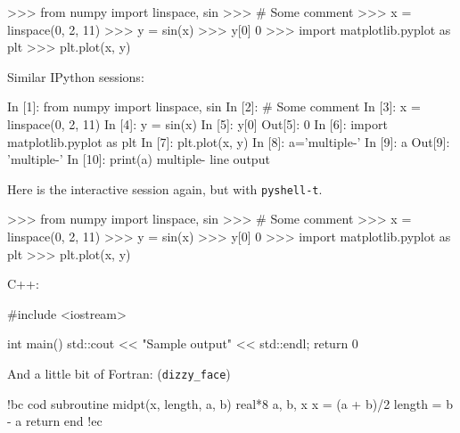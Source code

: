\documentclass[%
oneside,                 %
final,                   %
10pt]{article}
\theoremstyle{definition}
\begin{document}
\bpyshell
>>> from numpy import linspace, sin
>>> # Some comment
>>> x = linspace(0, 2, 11)
>>> y = sin(x)
>>> y[0]
0
>>> import matplotlib.pyplot as plt
>>> plt.plot(x, y)

\epyshell


Similar IPython sessions:

















\bipy
In [1]: from numpy import linspace, sin
In [2]: # Some comment
In [3]: x = linspace(0, 2, 11)
In [4]: y = sin(x)
In [5]: y[0]
Out[5]: 0
In [6]: import matplotlib.pyplot as plt
In [7]: plt.plot(x, y)
In [8]: a='multiple-\nline\noutput'
In [9]: a
Out[9]: 'multiple-\nline\noutput'
In [10]: print(a)
multiple-
line
output

\eipy


Here is the interactive session again, but with \texttt{pyshell-t}.










\bpyshell
>>> from numpy import linspace, sin
>>> # Some comment
>>> x = linspace(0, 2, 11)
>>> y = sin(x)
>>> y[0]
0
>>> import matplotlib.pyplot as plt
>>> plt.plot(x, y)

\epyshell


C++:








\bcpppro
#include <iostream>

int main()
{
   std::cout << "Sample output" << std::endl;
   return 0
}

\ecpppro

And a little bit of Fortran: (\Verb!dizzy_face!)










\bdo
!bc cod
      subroutine midpt(x, length, a, b)
      real*8 a, b, x
      x = (a + b)/2
      length = b - a
      return
      end
!ec
\end{document}
